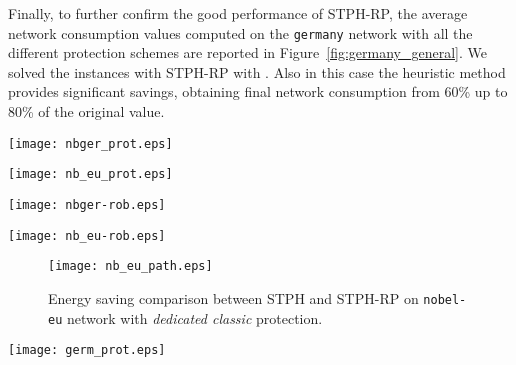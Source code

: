 \documentclass[final,5p,times,twocolumn]{elsarticle}
\begin{document}
Finally, to further confirm the good performance of STPH-RP, the average network consumption values computed on the {\tt germany} network with all the different protection schemes are reported in Figure~\ref{fig:germany_general}. We solved the instances with STPH-RP with . Also in this case the heuristic method provides significant savings, obtaining final network consumption from 60\% up to 80\% of the original value.



\begin{figure*}[t]\centering
  \texttt{[image: nbger\_prot.eps]}
  \caption{Energy savings achieved by STPH when implementing the different protection schemes on {\tt nobel-germany} instances.}
  \label{fig:nob_germany}
\texttt{[image: nb\_eu\_prot.eps]}
\caption{Energy savings achieved by STPH when implementing the different protection schemes on {\tt nobel-eu} instances. The  in the graph legend is used for the instances solved, due to complexity issues, with STPH-RP using . }
  \label{fig:nob_eu_general}
\end{figure*}

\begin{figure*}[t]\centering
  \texttt{[image: nbger-rob.eps]}
  \label{fig:nbger_robust_analysis}
  \caption{Energy savings achieved by STPH when implementing the robust scheme on {\tt nobel-germany} instances.}
  \texttt{[image: nb\_eu-rob.eps]}
  \label{fig:nb_eu_robust_analysis}
  \caption{Energy savings achieved by STPH when implementing the robust scheme on {\tt nobel-eu} instances.}
\end{figure*}



\begin{figure}[t]\centering
  \texttt{[image: nb\_eu\_path.eps]}
  \caption{Energy saving comparison between STPH and STPH-RP on {\tt nobel-eu} network with \textit{dedicated classic} protection.}
\label{fig:STPH_vs_STPH-RP}
\end{figure}

\begin{figure*}[t]\centering
  \texttt{[image: germ\_prot.eps]}
  \caption{Energy savings achieved by STPH-RP with  when implementing the different protection schemes on {\tt germany} instances.}
\label{fig:germany_general}
\end{figure*}
\end{document}

